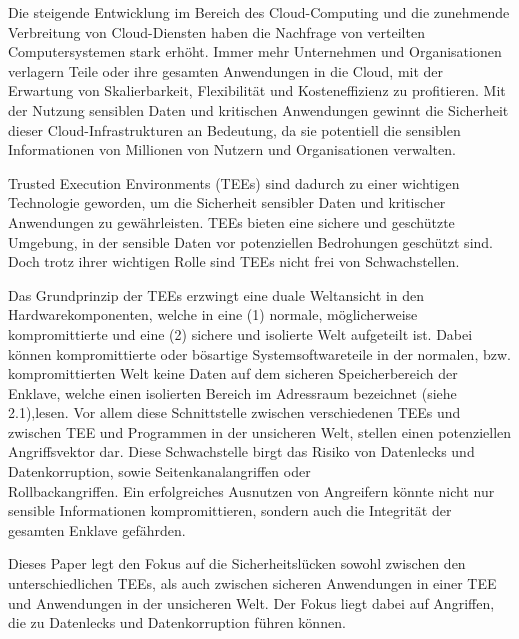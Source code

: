 Die steigende Entwicklung im Bereich des Cloud-Computing und die zunehmende Verbreitung von Cloud-Diensten haben die Nachfrage von verteilten Computersystemen stark erhöht. 
Immer mehr Unternehmen und Organisationen verlagern Teile oder ihre gesamten Anwendungen in die Cloud, mit der Erwartung von Skalierbarkeit, Flexibilität und Kosteneffizienz zu profitieren\cite{Cloud}. 
Mit der Nutzung sensiblen Daten und kritischen Anwendungen gewinnt die Sicherheit dieser Cloud-Infrastrukturen an Bedeutung, da sie potentiell die sensiblen Informationen von Millionen von Nutzern und Organisationen verwalten.

Trusted Execution Environments (TEEs) sind dadurch zu einer wichtigen Technologie geworden, um die Sicherheit sensibler Daten und kritischer Anwendungen zu gewährleisten. 
TEEs bieten eine sichere und geschützte Umgebung, in der sensible Daten vor potenziellen Bedrohungen geschützt sind. Doch trotz ihrer wichtigen Rolle sind TEEs nicht frei von Schwachstellen. 

Das Grundprinzip der TEEs erzwingt eine duale Weltansicht in den Hardwarekomponenten, welche in eine (1) normale, möglicherweise kompromittierte und eine (2) sichere und isolierte Welt aufgeteilt ist\cite{TEEPaper}. 
Dabei können kompromittierte oder bösartige Systemsoftwareteile in der normalen, bzw. kompromittierten Welt keine Daten auf dem sicheren Speicherbereich der Enklave, welche einen isolierten Bereich im Adressraum bezeichnet (siehe 2.1),lesen. Vor allem diese Schnittstelle zwischen verschiedenen TEEs und zwischen TEE und Programmen in der unsicheren Welt, stellen einen potenziellen Angriffsvektor dar. 
Diese Schwachstelle birgt das Risiko von Datenlecks und Datenkorruption, sowie Seitenkanalangriffen oder\\ Rollbackangriffen\cite{Memory}\cite{TEEPaper}. Ein erfolgreiches Ausnutzen von Angreifern könnte nicht nur sensible Informationen kompromittieren, sondern auch die Integrität der gesamten Enklave gefährden. 

Dieses Paper legt den Fokus auf die Sicherheitslücken sowohl zwischen den unterschiedlichen TEEs, als auch zwischen sicheren Anwendungen in einer TEE und Anwendungen in der unsicheren Welt. Der Fokus liegt dabei auf Angriffen, die zu Datenlecks und Datenkorruption führen können.